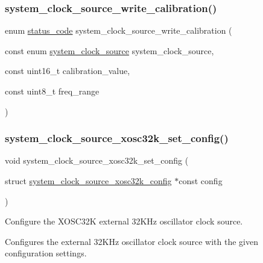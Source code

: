 \subsubsection{\texorpdfstring{system\_clock\_source\_write\_calibration()}{system\_clock\_source\_write\_calibration()}}
{\footnotesize\ttfamily enum \mbox{\hyperlink{group__group__sam0__utils__status__codes_ga751c892e5a46b8e7d282085a5a5bf151}{status\+\_\+code}} system\+\_\+clock\+\_\+source\+\_\+write\+\_\+calibration (\begin{DoxyParamCaption}\item[{const enum \mbox{\hyperlink{group__asfdoc__sam0__system__clock__group_ga86882dc960f2552722e9713da97fcc58}{system\+\_\+clock\+\_\+source}}}]{system\+\_\+clock\+\_\+source,  }\item[{const uint16\+\_\+t}]{calibration\+\_\+value,  }\item[{const uint8\+\_\+t}]{freq\+\_\+range }\end{DoxyParamCaption})}

\mbox{\label{group__asfdoc__sam0__system__clock__group_ga076bff009d78de95a0b2c9672f62b224}} 
\subsubsection{\texorpdfstring{system\_clock\_source\_xosc32k\_set\_config()}{system\_clock\_source\_xosc32k\_set\_config()}}
{\footnotesize\ttfamily void system\+\_\+clock\+\_\+source\+\_\+xosc32k\+\_\+set\+\_\+config (\begin{DoxyParamCaption}\item[{struct \mbox{\hyperlink{structsystem__clock__source__xosc32k__config}{system\+\_\+clock\+\_\+source\+\_\+xosc32k\+\_\+config}} $\ast$const}]{config }\end{DoxyParamCaption})}



Configure the X\+O\+S\+C32K external 32K\+Hz oscillator clock source. 

Configures the external 32K\+Hz oscillator clock source with the given configuration settings.


